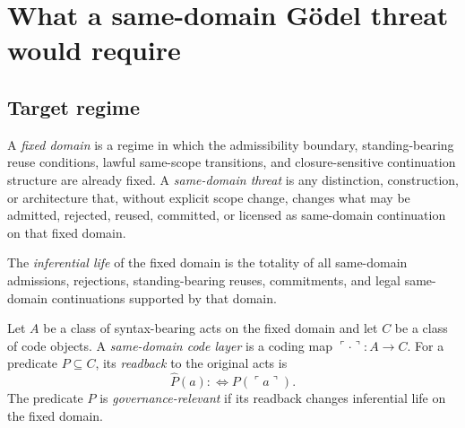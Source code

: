 \section{What a same-domain G\"odel threat would require}
\label{sec:target}

\subsection{Target regime}

\begin{definition}
A \emph{fixed domain} is a regime in which the admissibility boundary, standing-bearing reuse conditions, lawful same-scope transitions, and closure-sensitive continuation structure are already fixed. A \emph{same-domain threat} is any distinction, construction, or architecture that, without explicit scope change, changes what may be admitted, rejected, reused, committed, or licensed as same-domain continuation on that fixed domain.
\end{definition}

\begin{definition}
The \emph{inferential life} of the fixed domain is the totality of all same-domain admissions, rejections, standing-bearing reuses, commitments, and legal same-domain continuations supported by that domain.
\end{definition}

\begin{definition}
Let $A$ be a class of syntax-bearing acts on the fixed domain and let $C$ be a class of code objects. A \emph{same-domain code layer} is a coding map $\ulcorner\cdot\urcorner:A\to C$. For a predicate $P\subseteq C$, its \emph{readback} to the original acts is
\[
\widehat{P}(a) :\Longleftrightarrow P(\ulcorner a\urcorner).
\]
The predicate $P$ is \emph{governance-relevant} if its readback changes inferential life on the fixed domain.
\end{definition}

